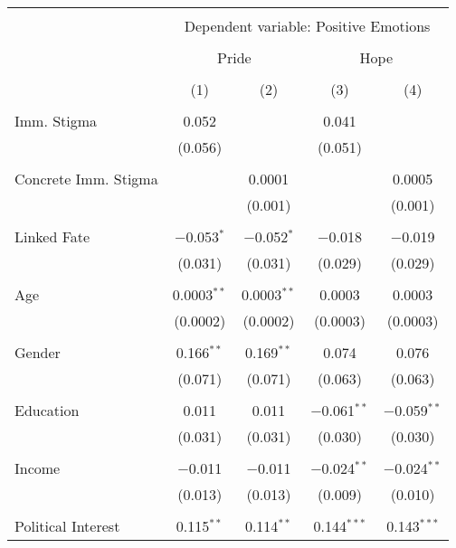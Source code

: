 
\begin{table}[!htbp] \centering 
  \caption{} 
  \label{} 
\begin{tabular}{@{\extracolsep{5pt}}lcccc} 
\\[-1.8ex]\hline 
\hline \\[-1.8ex] 
 & \multicolumn{4}{c}{Dependent variable: Positive Emotions} \\ 
\cline{2-5} 
\\[-1.8ex] & \multicolumn{2}{c}{Pride} & \multicolumn{2}{c}{Hope} \\ 
\\[-1.8ex] & (1) & (2) & (3) & (4)\\ 
\hline \\[-1.8ex] 
 Imm. Stigma & 0.052 &  & 0.041 &  \\ 
  & (0.056) &  & (0.051) &  \\ 
  & & & & \\ 
 Concrete Imm. Stigma &  & 0.0001 &  & 0.0005 \\ 
  &  & (0.001) &  & (0.001) \\ 
  & & & & \\ 
 Linked Fate & $-$0.053$^{*}$ & $-$0.052$^{*}$ & $-$0.018 & $-$0.019 \\ 
  & (0.031) & (0.031) & (0.029) & (0.029) \\ 
  & & & & \\ 
 Age & 0.0003$^{**}$ & 0.0003$^{**}$ & 0.0003 & 0.0003 \\ 
  & (0.0002) & (0.0002) & (0.0003) & (0.0003) \\ 
  & & & & \\ 
 Gender & 0.166$^{**}$ & 0.169$^{**}$ & 0.074 & 0.076 \\ 
  & (0.071) & (0.071) & (0.063) & (0.063) \\ 
  & & & & \\ 
 Education & 0.011 & 0.011 & $-$0.061$^{**}$ & $-$0.059$^{**}$ \\ 
  & (0.031) & (0.031) & (0.030) & (0.030) \\ 
  & & & & \\ 
 Income & $-$0.011 & $-$0.011 & $-$0.024$^{**}$ & $-$0.024$^{**}$ \\ 
  & (0.013) & (0.013) & (0.009) & (0.010) \\ 
  & & & & \\ 
 Political Interest & 0.115$^{**}$ & 0.114$^{**}$ & 0.144$^{***}$ & 0.143$^{***}$ \\ 

\end{tabular}
\end{table}
